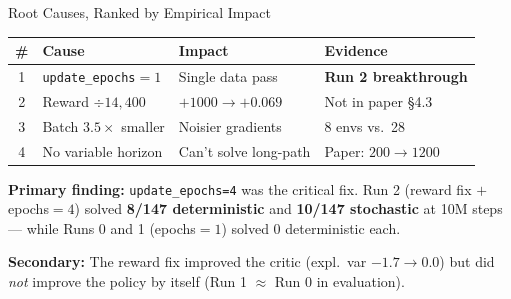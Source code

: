 \documentclass[aspectratio=169,11pt]{beamer}
\begin{document}
\begin{frame}{Root Causes, Ranked by Empirical Impact}
  \footnotesize
  \begin{center}
  \begin{tabular}{clll}
    \toprule
    \textbf{\#} & \textbf{Cause} & \textbf{Impact} & \textbf{Evidence} \\
    \midrule
    1 & \alert{\texttt{update\_epochs}${}=1$} & Single data pass & \textbf{Run 2 breakthrough} \\
    2 & Reward $\div 14{,}400$ & $+1000 \to +0.069$ & Not in paper \S4.3 \\
    3 & Batch $3.5\times$ smaller  & Noisier gradients  & 8 envs vs.\ 28 \\
    4 & No variable horizon        & Can't solve long-path & Paper: $200 \to 1200$ \\
    \bottomrule
  \end{tabular}
  \end{center}

  \bigskip
  \textbf{Primary finding:} \texttt{update\_epochs=4} was the critical fix.
  Run 2 (reward fix $+$ epochs${}=4$) solved \textbf{8/147 deterministic} and \textbf{10/147 stochastic}
  at 10M steps --- while Runs 0 and 1 (epochs${}=1$) solved 0 deterministic each.

  \bigskip
  \textbf{Secondary:} The reward fix improved the critic (expl.\ var $-1.7 \to 0.0$)
  but did \emph{not} improve the policy by itself (Run 1 $\approx$ Run 0 in evaluation).
\end{frame}
\end{document}
